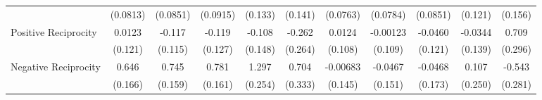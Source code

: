 {\begin{tabular}{l*{10}{c}}
            &    (0.0813)         &    (0.0851)         &    (0.0915)         &     (0.133)         &     (0.141)         &    (0.0763)         &    (0.0784)         &    (0.0851)         &     (0.121)         &     (0.156)         \\
\addlinespace
Positive Reciprocity&      0.0123         &      -0.117         &      -0.119         &      -0.108         &      -0.262         &      0.0124         &    -0.00123         &     -0.0460         &     -0.0344         &       0.709\sym{*}  \\
            &     (0.121)         &     (0.115)         &     (0.127)         &     (0.148)         &     (0.264)         &     (0.108)         &     (0.109)         &     (0.121)         &     (0.139)         &     (0.296)         \\
\addlinespace
Negative Reciprocity&       0.646\sym{***}&       0.745\sym{***}&       0.781\sym{***}&       1.297\sym{***}&       0.704\sym{*}  &    -0.00683         &     -0.0467         &     -0.0468         &       0.107         &      -0.543         \\
            &     (0.166)         &     (0.159)         &     (0.161)         &     (0.254)         &     (0.333)         &     (0.145)         &     (0.151)         &     (0.173)         &     (0.250)         &     (0.281)         \\
\bottomrule
\end{tabular}
}
